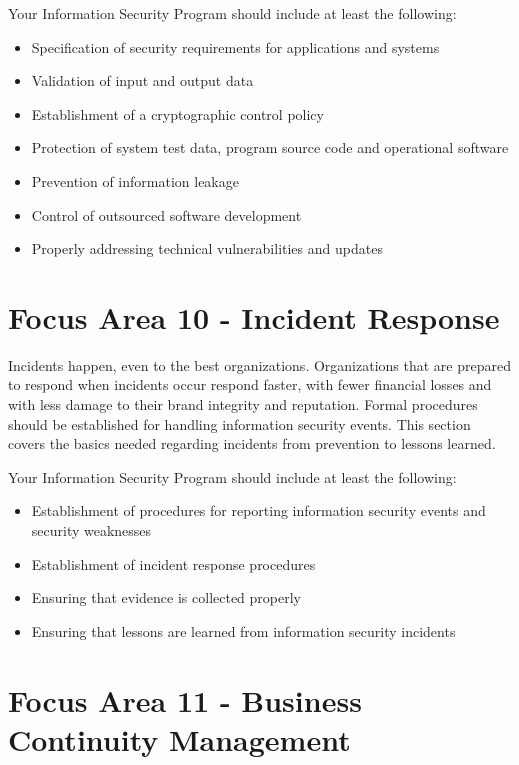 \documentclass{needs}
\begin{document}
		Your Information Security Program should include at least the following: 
		\begin{itemize}
			\item Specification of security requirements for applications and systems
			\item Validation of input and output data
			\item Establishment of a cryptographic control policy
			\item Protection of system test data, program source code and operational software
			\item Prevention of information leakage
			\item Control of outsourced software development
			\item Properly addressing technical vulnerabilities and updates
		\end{itemize}		
		
		\vspace{20pt}
		\fNineTable
		
		\section{Focus Area 10 - Incident Response}
		
			Incidents happen, even to the best organizations.  Organizations that are prepared to respond when incidents occur respond faster, with fewer financial losses and with less damage to their brand integrity and reputation.  Formal procedures should be established for handling information security events.  This section covers the basics needed regarding incidents from prevention to lessons learned.
			
			Your Information Security Program should include at least the following: 
			\begin{itemize}
				\item Establishment of procedures for reporting information security events and security weaknesses
				\item Establishment of incident response procedures
				\item Ensuring that evidence is collected properly
				\item Ensuring that lessons are learned from information security incidents
			\end{itemize}			
			
			\vspace{20pt}
			\fTenTable
		
		\section{Focus Area 11 - Business Continuity Management}
		
\end{document}
